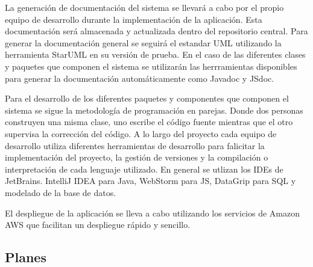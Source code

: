 La generación de documentación del sistema se llevará a cabo por el propio equipo de desarrollo durante la implementación de la aplicación. Esta documentación será almacenada y actualizada dentro del repositorio central. Para generar la documentación general se seguirá el estandar UML utilizando la herramienta StarUML en su versión de prueba. En el caso de las diferentes clases y paquetes que componen el sistema se utilizarán las herrramientas disponibles para generar la documentación automáticamente como Javadoc y JSdoc.

Para el desarrollo de los diferentes paquetes y componentes que componen el sistema se sigue la metodología de programación en parejas. Donde dos personas construyen una misma clase, uno escribe el código fuente mientras que el otro supervisa la corrección del código. A lo largo del proyecto cada equipo de desarrollo utiliza diferentes herramientas de desarrollo para falicitar la implementación del proyecto, la gestión de versiones y la compilación o interpretación de cada lenguaje utilizado. En general se utlizan los IDEs de JetBrains. IntelliJ IDEA para Java, WebStorm para JS, DataGrip para SQL y modelado de la base de datos.

El despliegue de la aplicación se lleva a cabo utilizando los servicios de Amazon AWS que facilitan un despliegue rápido y sencillo.

\subsection{Planes}
\label{pl}
